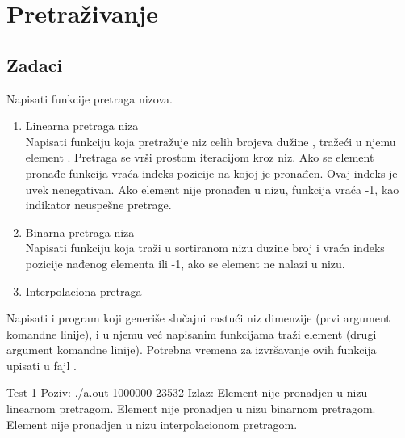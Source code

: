 
\chapter{Pretraživanje}

\section{Zadaci}

\begin{Exercise}[label=401]
  Napisati funkcije pretraga nizova.
  \begin{enumerate}  
  \item Linearna pretraga niza\\ Napisati funkciju koja pretražuje niz
    celih brojeva dužine , tražeći u njemu element
    . Pretraga se vrši prostom iteracijom kroz niz. Ako se
    element pronađe funkcija vraća indeks pozicije na kojoj je
    pronađen. Ovaj indeks je uvek nenegativan.  Ako element nije
    pronađen u nizu, funkcija vraća -1, kao indikator neuspešne
    pretrage.
  \item Binarna pretraga niza\\ Napisati funkciju koja traži u
    sortiranom nizu  duzine  broj  i vraća
    indeks pozicije nađenog elementa ili -1, ako se element ne
    nalazi u nizu.
  \item Interpolaciona pretraga
  \end{enumerate}
  Napisati i program koji generiše slučajni rastući niz dimenzije
   (prvi argument komandne linije), i u njemu već napisanim
  funkcijama traži element  (drugi argument komandne
  linije). Potrebna vremena za izvršavanje ovih funkcija upisati u
  fajl .
  
\begin{maxitest}
\begin{test}{Test 1}
Poziv: ./a.out 1000000 23532
Izlaz: Element nije pronadjen u nizu linearnom pretragom.
       Element nije pronadjen u nizu binarnom pretragom.
       Element nije pronadjen u nizu interpolacionom pretragom.  
\end{test}
\end{maxitest}
  
\end{Exercise}

\begin{Answer}[ref=401]
\end{Answer}

